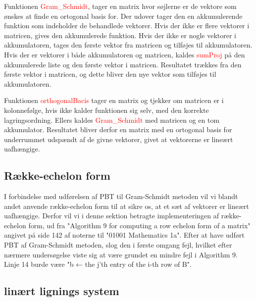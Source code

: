 Funktionen \textcolor{red}{Gram\_Schmidt}, tager en matrix hvor søjlerne er de vektore som ønskes at finde en ortogonal basis for. Der udover tager den en akkumulerende funktion som indeholder de behandlede vektorer. Hvis der ikke er flere vektorer i matricen, gives den akkumulerede funktion. Hvis der ikke er nogle vektorer i akkumulatoren, tages den første vektor fra matricen og tilføjes til akkumulatoren. Hvis der er vektorer i både akkumulatoren og matricen, kaldes \textcolor{red}{sumProj} på den akkumulerede liste og den første vektor i matricen. Resultatet trækkes fra den første vektor i matricen, og dette bliver den nye vektor som tilføjes til akkumulatoren. 

Funktionen \textcolor{red}{orthogonalBacis} tager en matrix og tjekker om matricen er i kolonnefølge, hvis ikke kalder funktionen sig selv, med den korrekte lagringsordning. Ellers kaldes \textcolor{red}{Gram\_Schmidt} med matricen og en tom akkumulator. Resultatet bliver derfor en matrix med en ortogonal basis for underrummet udspændt af de givne vektorer, givet at vektorerne er lineært uafhængige.

\subsection{Række-echelon form}
I forbindelse med udførelsen af PBT til Gram-Schmidt metoden vil vi blandt andet anvende række-echelon form til at sikre os, at et sæt af vektorer er lineært uafhængige. Derfor vil vi i denne sektion betragte implementeringen af række-echelon form, ud fra "Algorithm 9 for computing a row echelon form of a matrix" angivet på side 142 af noterne til "01001 Mathematics 1a". Efter at have udført PBT af Gram-Schmidt metoden, slog den i første omgang fejl, hvilket efter nærmere undersøgelse viste sig at være grundet en mindre fejl i Algorithm 9. Linje 14 burde være "b ← the j'th entry of the i-th row of B". 


\subsection{linært lignings system}\label{sec:lin_eq}
